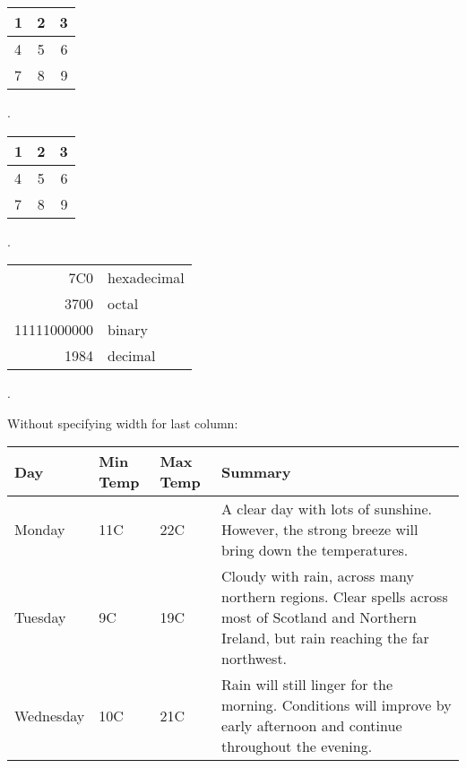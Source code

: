 \documentclass{article}
\begin{document}
\begin{center}
  \begin{tabular}{ | l | c | r }
    \hline
    1 & 2 & 3 \\ \hline
    4 & 5 & 6 \\ \hline
    7 & 8 & 9 \\
    \hline
  \end{tabular}
\end{center}



{
.\newline\newline\newline
}





\begin{center}
  \begin{tabular}{ | l | c | r | }
    \hline
    1 & 2 & 3 \\ \hline
    4 & 5 & 6 \\ \hline
    7 & 8 & 9 \\
    \hline
  \end{tabular}
\end{center}



{
.\newline\newline\newline
}






\begin{tabular}{|r|l|}
  \hline
  7C0 & hexadecimal \\
  3700 & octal \\ \cline{2-2}
  11111000000 & binary \\
  \hline \hline
  1984 & decimal \\
  \hline
\end{tabular}




{
.\newline\newline\newline
}




Without specifying width for last column:
\begin{center}
    \begin{tabular}{| l | l | l | l |}
    \hline
    Day & Min Temp & Max Temp & Summary \\ \hline
    Monday & 11C & 22C & A clear day with lots of sunshine.
    However, the strong breeze will bring down the temperatures. \\ \hline
    Tuesday & 9C & 19C & Cloudy with rain, across many northern regions. Clear spells 
    across most of Scotland and Northern Ireland, 
    but rain reaching the far northwest. \\ \hline
    Wednesday & 10C & 21C & Rain will still linger for the morning. 
    Conditions will improve by early afternoon and continue 
    throughout the evening. \\
    \hline
    \end{tabular}
\end{center}
\end{document}
